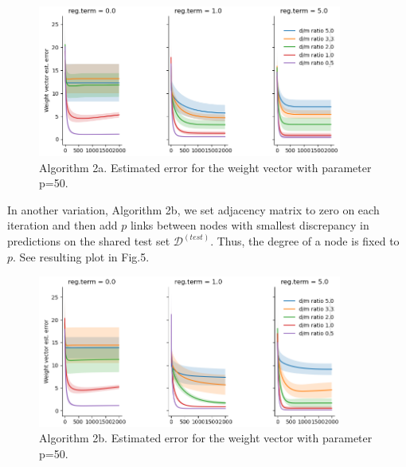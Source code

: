 \documentclass{article}
\begin{document}
\begin{figure}[h]
\includegraphics[width=10cm]{Linreg_Torch_672336_est_error_Algo2a_nn50.png}
\caption{Algorithm 2a. Estimated error for the weight vector with parameter p=50.}
\end{figure}

\newpage
In another variation, Algorithm 2b, we set adjacency matrix to zero on each iteration and then add $p$ links between nodes with smallest discrepancy in predictions on the shared test set $\mathcal{D}^{(test)}$. Thus, the degree of  a node is fixed to $p$. See resulting plot in Fig.5.

\begin{figure}[h]
\includegraphics[width=10cm]{Linreg_Torch_673711_est_error_algo2b_nn50.png}
\caption{Algorithm 2b. Estimated error for the weight vector with parameter p=50.}
\end{figure}
\end{document}
